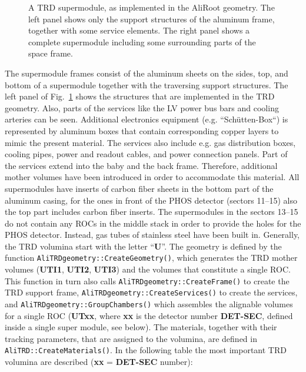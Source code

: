 \documentclass{alicetdr}
\begin{document}
\begin{figure}[htb]
\begin{center}
\begin{minipage}[b]{0.49\textwidth}
\begin{center}
\end{center}
\end{minipage}
\end{center}
\caption{
A TRD supermodule, as implemented in the AliRoot geometry.  The left
panel shows only the support structures of the aluminum frame, together
with some service elements.  The right panel shows a complete 
supermodule including some surrounding parts of the space frame.
}
\label{FIG_GEO:sm_geom}
\end{figure}
%
The supermodule frames consist of the aluminum sheets on the sides, top,
and bottom of a supermodule together with the traversing support structures.
The left panel of Fig.~\ref{FIG_GEO:sm_geom} shows the structures that are
implemented in the TRD geometry.  Also, parts of the services like the LV
power bus bars and cooling arteries can be seen.  Additional electronics 
equipment (e.g. ``Sch\"utten-Box``) is represented by aluminum boxes that 
contain corresponding copper layers to mimic the present material.  The 
services also include e.g. gas distribution boxes, cooling pipes, power and
readout cables, and power connection panels.  Part of the services extend
into the baby and the back frame.  Therefore, additional mother volumes
have been introduced in order to accommodate this material.  All supermodules 
have inserts of carbon fiber sheets in the bottom part of the aluminum 
casing, for the ones in front of the PHOS detector (sectors 11--15) also 
the top part includes carbon fiber inserts.  The supermodules in the sectors 
13--15 do not contain any ROCs in the middle stack in order to provide the 
holes for the PHOS detector.  Instead, gas tubes of stainless steel have
been built in.
%
Generally, the TRD volumina start with the letter  ``{\bf U}''.  The geometry
is defined by the function {\tt AliTRDgeometry::CreateGeometry()}, which
generates the TRD mother volumes ({\bf UTI1}, {\bf UTI2}, {\bf UTI3}) and the 
volumes that constitute a single ROC.  This function in turn also calls 
{\tt AliTRDgeometry::CreateFrame()} to create the TRD support frame, 
{\tt AliTRDgeometry::CreateServices()} to create the services, and 
{\tt AliTRDgeometry::GroupChambers()} which assembles the alignable
volumes for a single ROC ({\bf UTxx}, where {\bf xx} is the detector
number {\bf DET-SEC}, defined inside a single super module, see below). The
materials, together with their tracking parameters, that are assigned to
the volumina, are defined in {\tt AliTRD::CreateMaterials()}.
In the following table the most important TRD volumina are described
({\bf xx} = {\bf DET-SEC} number):
\end{document}
